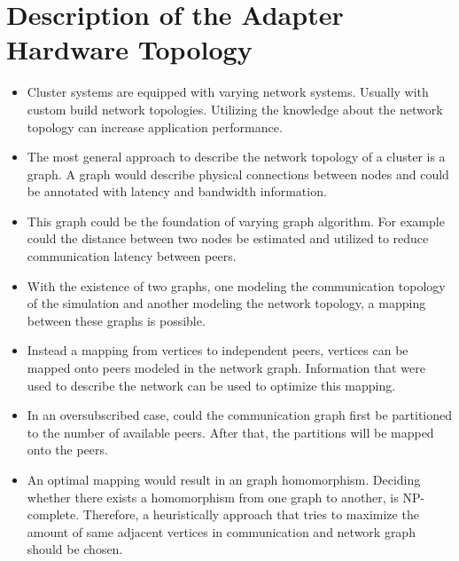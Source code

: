 \section*{Description of the Adapter Hardware Topology}
\begin{itemize}

\item Cluster systems are equipped with varying network
  systems. Usually with custom build network topologies.  Utilizing the
  knowledge about the network topology can increase application
  performance.

\item The most general approach to describe the network topology of a
  cluster is a graph. A graph would describe physical connections
  between nodes and could be annotated with latency and bandwidth
  information.

\item This graph could be the foundation of varying graph
  algorithm. For example could the distance between two nodes be
  estimated and utilized to reduce communication latency between
  peers.
  
\item With the existence of two graphs, one modeling the communication
  topology of the simulation and another modeling the network
  topology, a mapping between these graphs is possible.
  
\item Instead a mapping from vertices to independent peers, vertices
  can be mapped onto peers modeled in the network graph. Information that were
  used to describe the network can be used to optimize this mapping.

\item In an oversubscribed case, could the communication graph first
  be partitioned to the number of available peers. After that, the
  partitions will be mapped onto the peers.

\item An optimal mapping would result in an graph
  homomorphism. Deciding whether there exists a homomorphism from one
  graph to another, is NP-complete. Therefore, a heuristically
  approach that tries to maximize the amount of same adjacent vertices
  in communication and network graph should be chosen.
  

\end{itemize}
